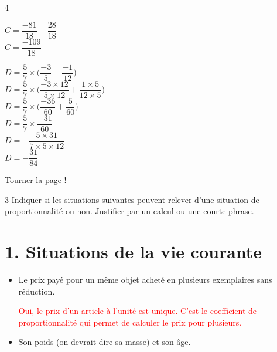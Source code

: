 \documentclass[a4paper]{book}
\begin{document}
{\begin{exerciceNote}{4}
\begin{minipage}{0.24\linewidth}
            $C = \dfrac{-81}{18}-\dfrac{28}{18}$ \\[2ex]

            $C = \dfrac{-109}{18}$
        \end{minipage}
        \hfill\vline\hfill
        \begin{minipage}{0.24\linewidth}
            $D = \dfrac{5}{7}\times\bigg(\dfrac{-3}{5}-\dfrac{-1}{12}\bigg)$ \\[2ex]

            $D = \dfrac{5}{7}\times\bigg(\dfrac{-3\times12}{5\times12}+\dfrac{1\times5}{12\times5}\bigg)$ \\[2ex]

            $D = \dfrac{5}{7}\times\bigg(\dfrac{-36}{60}+\dfrac{5}{60}\bigg)$ \\[2ex]

            $D = \dfrac{5}{7}\times\dfrac{-31}{60}$ \\[2ex]

            $D = -\dfrac{5\times31}{7\times5\times12}$ \\[2ex]

            $D = -\dfrac{31}{84}$
        \end{minipage}     
    \end{exerciceNote}

\vfill
\hfill Tourner la page !

\newpage


    \begin{exerciceNote}{3}        
        Indiquer si les situations suivantes peuvent relever d'une situation de proportionnalité ou non. Justifier par un calcul ou une courte phrase.


        \section*{1. Situations de la vie courante}

        \begin{itemize}
            \item Le prix payé pour un même objet acheté en plusieurs exemplaires sans réduction. 

            \medskip

            \textcolor{red}{Oui, le prix d'un article à l'unité est unique. C'est le coefficient de proportionnalité qui permet de calculer le prix pour plusieurs.}
            
            \item Son poids (on devrait dire sa masse) et son âge. 


\end{itemize}
\end{exerciceNote}}
\end{document}
